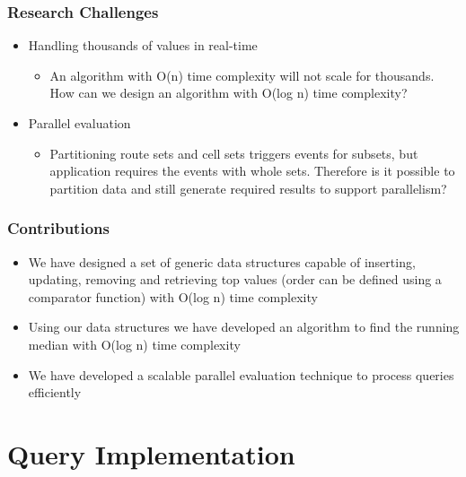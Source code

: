 \documentclass{beamer}
\begin{document}
\begin{frame}
\frametitle{Research Challenges}
\begin{itemize}
	\item Handling thousands of values in real-time
		\begin{itemize}
			\item An algorithm with O(n) time complexity will not scale for thousands. How can we design an algorithm with O(log n) time complexity?
		\end{itemize}
	\item Parallel evaluation
		\begin{itemize}
                        \item Partitioning route sets and cell sets triggers events for subsets, but application requires the events with whole sets. Therefore is it possible to partition data and still generate required results to support parallelism? 
                \end{itemize}
\end{itemize}

\end{frame}

\begin{frame}
\frametitle{Contributions}
\begin{itemize}
        \item We have designed a set of  generic data structures capable of inserting, updating, removing and retrieving top values (order can be defined using a comparator function) with O(log n) time complexity
        \item Using our data structures we have developed an algorithm to find the running median with O(log n) time complexity 
	\item We have developed a scalable parallel evaluation technique to process queries efficiently
\end{itemize}

\end{frame}

\section{Query Implementation}
\end{document}
